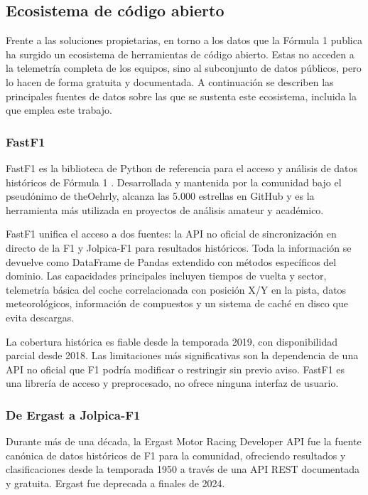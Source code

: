 \documentclass[12pt,a4paper,twoside,openright]{book}
\begin{document}
\subsection{Ecosistema de código abierto}
Frente a las soluciones propietarias, en torno a los datos que la Fórmula 1 publica ha surgido un ecosistema de herramientas de código abierto. Estas no acceden a la telemetría completa de los equipos, sino al subconjunto de datos públicos, pero lo hacen de forma gratuita y documentada. A continuación se describen las principales fuentes de datos sobre las que se sustenta este ecosistema, incluida la que emplea este trabajo.
\subsubsection{FastF1}
\noindent FastF1 es la biblioteca de Python de referencia para el acceso y análisis de datos históricos de Fórmula 1 \cite{fastf1}. Desarrollada y mantenida por la comunidad bajo el pseudónimo de theOehrly, alcanza las 5.000 estrellas en GitHub y es la herramienta más utilizada en proyectos de análisis amateur y académico.

\noindent FastF1 unifica el acceso a dos fuentes: la API no oficial de sincronización en directo de la F1 y Jolpica-F1 para resultados históricos. Toda la información se devuelve como DataFrame de Pandas extendido con métodos específicos del dominio. Las capacidades principales incluyen tiempos de vuelta y sector,
telemetría básica del coche correlacionada con posición X/Y en la pista, datos meteorológicos, información de compuestos y un sistema de caché en disco que evita descargas.

\noindent La cobertura histórica es fiable desde la temporada 2019, con disponibilidad parcial desde 2018. Las limitaciones más significativas son la dependencia de una API no oficial que F1 podría modificar o restringir sin previo aviso.
FastF1 es una librería de acceso y preprocesado, no ofrece ninguna interfaz de usuario.

\subsubsection{De Ergast a Jolpica-F1}
\noindent Durante más de una década, la Ergast Motor Racing Developer API \cite{ergast} fue la fuente canónica de datos históricos de F1 para la comunidad, ofreciendo resultados y clasificaciones desde la temporada 1950 a través de una API REST documentada y gratuita. Ergast fue deprecada a finales de 2024.
\end{document}
